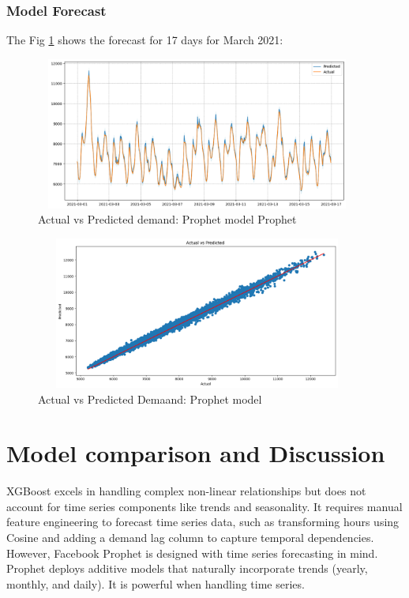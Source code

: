\documentclass[mstat,12pt]{unswthesis}
\begin{document}
\subsection{Model Forecast}\label{model-forecast}

The Fig \ref{prophet_actual_predict_output} shows the forecast for 17
days for March 2021:

\begin{figure}[H]
\centering
\includegraphics[width=0.95\textwidth, height=5cm]{prophet_actual_predict_output.png}
\caption{Actual vs Predicted demand: Prophet model Prophet}\label{prophet_actual_predict_output}
\end{figure}

\begin{figure}[H]
\centering
\includegraphics[width=0.95\textwidth, height=5cm]{prophet_actual_predict.png}
\caption{Actual vs Predicted Demaand: Prophet model}\label{prophet_actual}
\end{figure}

\chapter{Model comparison and
Discussion}\label{model-comparison-and-discussion}

XGBoost excels in handling complex non-linear relationships but does not
account for time series components like trends and seasonality. It
requires manual feature engineering to forecast time series data, such
as transforming hours using Cosine and adding a demand lag column to
capture temporal dependencies. However, Facebook Prophet is designed
with time series forecasting in mind. Prophet deploys additive models
that naturally incorporate trends (yearly, monthly, and daily). It is
powerful when handling time series.
\end{document}
